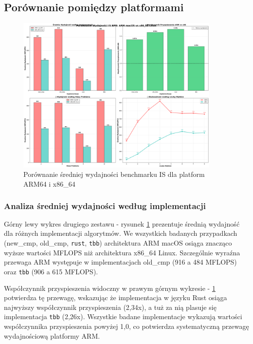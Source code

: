 \subsection{Porównanie pomiędzy platformami}
\begin{figure}[H]
    \centering
    \includegraphics[width=0.9\textwidth]{analiza/images/parallel/is/compare/is_porownanie_platform_arm_vs_x86.png}
    \caption{Porównanie średniej wydajności benchmarku IS dla platform ARM64 i x86\_64}
    \label{is_porownanie_wydajnosci_platformy}
\end{figure}
\subsubsection{Analiza średniej wydajności według implementacji}
Górny lewy wykres drugiego zestawu - rysunek \ref{is_porownanie_wydajnosci_platformy} prezentuje średnią wydajność dla różnych implementacji algorytmów. We wszystkich badanych przypadkach (new\_cmp, old\_cmp, \texttt{rust}, \texttt{tbb}) architektura ARM macOS osiąga znacząco wyższe wartości MFLOPS niż architektura x86\_64 Linux. Szczególnie wyraźna przewaga ARM występuje w implementacjach old\_cmp (916 a 484 MFLOPS) oraz \texttt{tbb} (906 a 615 MFLOPS).

Współczynnik przyspieszenia widoczny w prawym górnym wykresie - \ref{is_porownanie_wydajnosci_platformy} potwierdza tę przewagę, wskazując że implementacja w języku Rust osiąga najwyższy współczynnik przyspieszenia (2,34x), a tuż za nią plasuje się implementacja \texttt{tbb} (2,26x). Wszystkie badane implementacje wykazują wartości współczynnika przyspieszenia powyżej 1,0, co potwierdza systematyczną przewagę wydajnościową platformy ARM.

